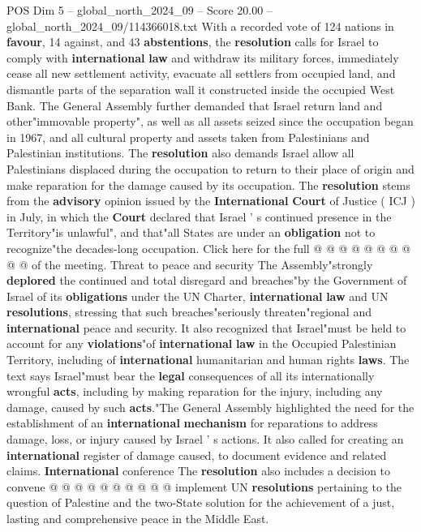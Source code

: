 \begin{textsample}{POS Dim 5 – global\_north\_2024\_09 – Score 20.00 – global\_north\_2024\_09/114366018.txt}  \label{ex:f5_pos_311}
With a recorded vote of 124 nations in \textbf{favour}, 14 against, and 43 \textbf{abstentions}, the \textbf{resolution} calls for Israel to comply with \textbf{international} \textbf{law} and withdraw its military forces, immediately cease all new settlement activity, evacuate all settlers from occupied land, and dismantle parts of the separation wall it constructed inside the occupied West Bank.
The General Assembly further demanded that Israel return land and other"immovable property", as well as all assets seized since the occupation began in 1967, and all cultural property and assets taken from Palestinians and Palestinian institutions.
The \textbf{resolution} also demands Israel allow all Palestinians displaced during the occupation to return to their place of origin and make reparation for the damage caused by its occupation.
The \textbf{resolution} stems from the \textbf{advisory} opinion issued by the \textbf{International} \textbf{Court} of Justice ( ICJ ) in July, in which the \textbf{Court} declared that Israel ' s continued presence in the Territory"is unlawful", and that"all States are under an \textbf{obligation} not to recognize"the decades-long occupation.
Click here for the full @ @ @ @ @ @ @ @ @ @ of the meeting.
Threat to peace and security The Assembly"strongly \textbf{deplored} the continued and total disregard and breaches"by the Government of Israel of its \textbf{obligations} under the UN Charter, \textbf{international} \textbf{law} and UN \textbf{resolutions}, stressing that such breaches"seriously threaten"regional and \textbf{international} peace and security.
It also recognized that Israel"must be held to account for any \textbf{violations}"of \textbf{international} \textbf{law} in the Occupied Palestinian Territory, including of \textbf{international} humanitarian and human rights \textbf{laws}.
The text says Israel"must bear the \textbf{legal} consequences of all its internationally wrongful \textbf{acts}, including by making reparation for the injury, including any damage, caused by such \textbf{acts}."The General Assembly highlighted the need for the establishment of an \textbf{international} \textbf{mechanism} for reparations to address damage, loss, or injury caused by Israel ' s actions.
It also called for creating an \textbf{international} register of damage caused, to document evidence and related claims. \textbf{International} conference The \textbf{resolution} also includes a decision to convene @ @ @ @ @ @ @ @ @ @ implement UN \textbf{resolutions} pertaining to the question of Palestine and the two-State solution for the achievement of a just, lasting and comprehensive peace in the Middle East.

\end{textsample}
